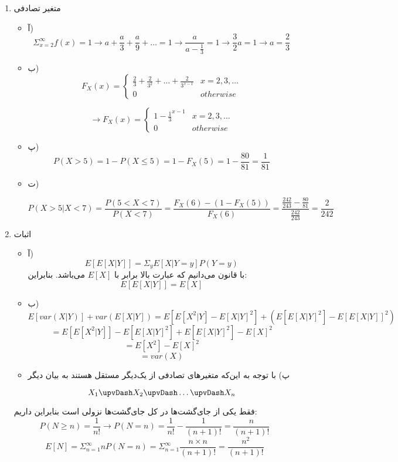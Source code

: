 
\begin{enumerate}
	\item متغیر تصادفی
	
	\begin{itemize}
		\item آ)
		\\
		$$\Sigma_{x = 2}^{\infty} f(x) = 1 \rightarrow
		 a + \frac{a}{3} + \frac{a}{9} + \dots = 1
		 \rightarrow
		 \frac{a}{a - \frac{1}{3}} = 1 
		 \rightarrow
		 \frac{3}{2} a = 1 
		 \rightarrow
		 a = \frac{2}{3}
		$$
		\item ب)
		$$
		F_X(x) = \begin{cases} 
		\frac{2}{3} + \frac{2}{3^2} + \dots + \frac{2}{3^{x - 1}}
		 &
		  x = 2, 3, \dots \\
		0 & otherwise
		\end{cases}
		$$
		
		$$
		\rightarrow F_X(x) = \begin{cases} 
		1 - \frac{1}{3}^{x - 1}
		&
		x = 2, 3, \dots \\
		0 & otherwise
		\end{cases}
		$$
		\item پ)
		$$P(X > 5) = 1 - P(X \leq 5)
		 = 1 - F_X(5)
		 = 1 - \frac{80}{81}
		 = \frac{1}{81} $$
		\item ت)
		
		$$P(X > 5 | X < 7) = 
		\frac{P(5 < X < 7)}{P(X < 7)} = \frac{F_X(6) - (1 - F_X(5))}{F_X(6)} = \frac{\frac{242}{243} - \frac{80}{81}}{\frac{242}{243}} = \frac{2}{242}
		$$
	\end{itemize}
	\item 
	اثبات
	\begin{itemize}
		\item آ)
		$$
		E[E[X|Y]] = \Sigma_{y} E[X|Y = y]P(Y = y)
		$$
		با قانون  می‌دانیم که عبارت بالا برابر با $E[X]$ می‌باشد. بنابراین:
		$$E[E[X|Y]] = E[X]$$
		\item ب)
		$$E[var(X|Y)] + var(E[X|Y])
		= E[E[X^2|Y] - E[X|Y]^2] + (E[E[X|Y]^2] - E[E[X|Y]]^2)
		$$
		$$
		= E[E[X^2| Y]] - E[E[X|Y]^2] + E[E[X|Y]^2] - E[X]^2
		$$
		$$
		= E[X^2] - E[X]^2
		$$
		$$
		= var(X)
		$$
		\item پ)
		با توجه به این‌که متغیرهای تصادفی از یک‌دیگر مستقل هستند به بیان دیگر 
		
		$$X_1 \upvDash X_2 \upvDash \dots \upvDash X_n$$
	\end{itemize}
	فقط یکی از جای‌گشت‌ها در کل جای‌گشت‌ها نزولی است بنابراین داریم:
	$$P(N \ge n) = \frac{1}{n!} \rightarrow P(N = n) = \frac{1}{n!} - \frac{1}{(n + 1)!} = \frac{n}{(n + 1)!}$$
	$$E[N] = \Sigma_{n=1}^{\infty} nP(N=n) = \Sigma_{n=1}^{\infty} \frac{n \times n}{(n + 1)!} = \frac{n^2}{(n + 1)!}$$
\end{enumerate}